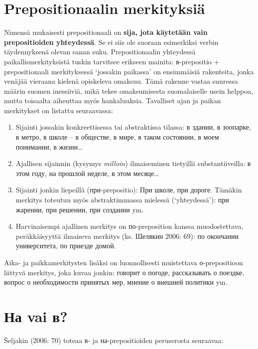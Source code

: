 \documentclass[]{scrreprt}
\providecommand{\tightlist}{%
  \setlength{\itemsep}{0pt}\setlength{\parskip}{0pt}}
\begin{document}
\section{Prepositionaalin
merkityksiä}\label{prepositionaalin-merkityksiuxe4}

Nimensä mukaisesti prepositionaali on \textbf{sija, jota käytetään vain
prepositioiden yhteydessä}. Se ei siis ole suoraan esimerkiksi verbin
täydennyksenä olevan sanan suku. Prepositionaalin yhteydessä
paikallismerkityksistä tuskin tarvitsee erikseen mainita: в-prepositio +
prepositionaali merkityksessä `jossakin paikassa' on ensimmäisiä
rakenteita, jonka venäjää vieraana kielenä opiskeleva omaksuu. Tämä
rakenne vastaa suuressa määrin suomen inessiiviä, mikä tekee
omaksumisesta suomalaiselle usein helppoa, mutta toisaalta aiheuttaa
myös hankaluuksia. Tavalliset ajan ja paikan merkitykset on listattu
seuraavassa:

\begin{enumerate}
\def\labelenumi{\arabic{enumi}.}
\tightlist
\item
  Sijainti jossakin konkreettisessa tai abstraktissa tilassa: в здании,
  в зоопарке, в метро, в школе -- в обществе, в мире, в таком состоянии,
  в моем понимании, в жизни\ldots{}
\item
  Ajallisen sijainnin (kysymys \emph{milloin}) ilmaiseminen tietyillä
  substantiiveilla: в этом году, на прошлой неделе, в этом
  месяце\ldots{}
\item
  Sijainti jonkin liepeillä (при-prepositio): При школе, при дороге.
  Tämäkin merkitys toteutuu myös abstraktimmassa mielessä
  (`yhteydessä'): при жарении, при решении, при создании ym.
\item
  Harvinaisempi ajallinen merkitys on по-preposition kanssa
  muodostettava, peräkkäisyyttä ilmaiseva merkitys (ks. Шелякин 2006:
  69): по окончании университета, по приезде домой.
\end{enumerate}

Aika- ja paikkamerkitysten lisäksi on luonnollisesti muistettava
о-prepositioon liittyvä merkitys, joka kuvaa jonkin: говорит о погоде,
рассказывать о поездке, вопрос о необходимости принятых мер, мнение о
внешней политики ym.

\section{На vai в?}\label{ux43dux430-vai-ux432}

Šeljakin (2006: 70) toteaa в- ja на-prepositioiden peruserosta
seuraavaa:
\end{document}
